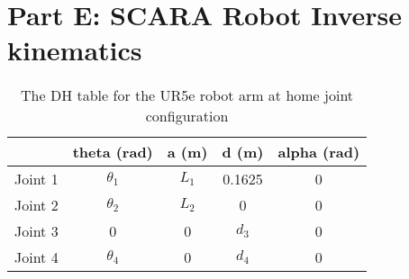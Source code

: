 \section{Part E: SCARA Robot Inverse kinematics}

\begin{table}[H]
    \centering
    \begin{tabular}{|c|c|c|c|c|}
        \hline
                & \textbf{theta (rad)} & \textbf{a (m)} & \textbf{d (m)} & \textbf{alpha (rad)} \\ \hline
        Joint 1 & $\theta_1$           & $L_1$          & 0.1625         & 0                    \\ \hline
        Joint 2 & $\theta_2$           & $L_2$          & 0              & 0                    \\ \hline
        Joint 3 & 0                    & 0              & $d_3$          & 0                    \\ \hline
        Joint 4 & $\theta_4$           & 0              & $d_4$          & 0                    \\ \hline
    \end{tabular}
    \caption{The DH table for the UR5e robot arm at home joint configuration}
    \label{table:Scara DH Table}
\end{table}


